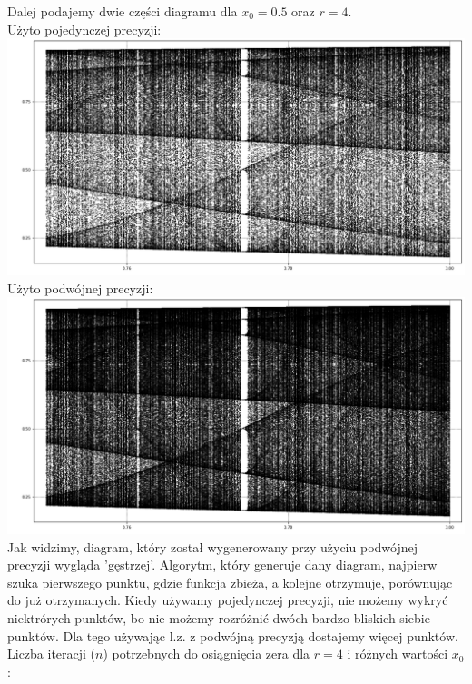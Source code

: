 \documentclass[12pt,a4paper]{article}
\begin{document}
  Dalej podajemy dwie części diagramu dla $x_0 = 0.5$ oraz $r = 4$. \vspace{3mm}\\
  Użyto pojedynczej precyzji:\newline
  \includegraphics[width=1\textwidth]{img/sp} \newline
  Użyto podwójnej precyzji: \newline
  \includegraphics[width=1\textwidth]{img/dp} \newline
  Jak widzimy, diagram, który został wygenerowany przy użyciu podwójnej precyzji
  wygląda 'gęstrzej'. Algorytm, który generuje dany diagram, najpierw szuka
  pierwszego punktu, gdzie funkcja zbieża, a kolejne otrzymuje, porównując do
  już otrzymanych. Kiedy używamy pojedynczej precyzji, nie możemy wykryć
  niektrórych punktów, bo nie możemy rozróżnić dwóch bardzo bliskich siebie
  punktów. Dla tego używając l.z. z podwójną precyzją dostajemy więcej
  punktów. \vspace{3mm}\\
  Liczba iteracji ($n$) potrzebnych do osiągnięcia zera dla $r = 4$ i
  różnych wartości $x_0$: \\
\end{document}
